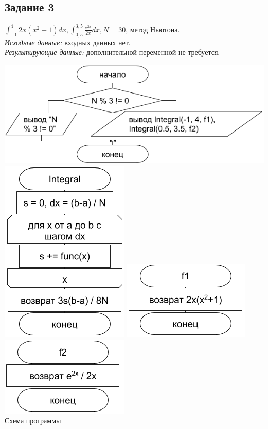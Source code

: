 \documentclass[a4paper,14pt]{extarticle}
\begin{document}
\subsection{Задание 3}
$ \displaystyle\int_{-1}^4 2x(x^2+1) dx , \displaystyle\int_{0,5}^{3,5} \frac{e^{2x}}{2x} dx, N = 30 $, метод Ньютона.\\
\textit{Исходные данные:} входных данных нет.\\
\textit{Результирующие данные:} дополнительной переменной не требуется.\\
\begin{center}
\includegraphics[scale=0.6]{lab5-3.png}\\
\vspace{0.3cm}
\includegraphics[scale=0.6]{lab5-3-1.png}
\includegraphics[scale=0.6]{lab5-3-2.png}
\includegraphics[scale=0.6]{lab5-3-3.png}\\
Схема программы
\end{center}
\end{document}
